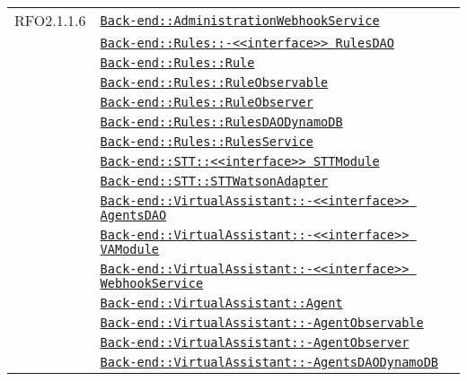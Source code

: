 \begin{longtable}{|>{\centering}m{3cm}|m{10cm}<{\centering}|}
RFO2.1.1.6 & \hyperref[Back-end::AdministrationWebhookService]{\texttt{Back-end::AdministrationWebhookService}}\\
& \hyperref[Back-end::Rules::<<interface>> RulesDAO]{\texttt{Back-end::Rules::-\linebreak <<interface>> RulesDAO}}\\
& \hyperref[Back-end::Rules::Rule]{\texttt{Back-end::Rules::Rule}}\\
& \hyperref[Back-end::Rules::RuleObservable]{\texttt{Back-end::Rules::RuleObservable}}\\
& \hyperref[Back-end::Rules::RuleObserver]{\texttt{Back-end::Rules::RuleObserver}}\\
& \hyperref[Back-end::Rules::RulesDAODynamoDB]{\texttt{Back-end::Rules::RulesDAODynamoDB}}\\
& \hyperref[Back-end::Rules::RulesService]{\texttt{Back-end::Rules::RulesService}}\\
& \hyperref[Back-end::STT::<<interface>> STTModule]{\texttt{Back-end::STT::<<interface>> STTModule}}\\
& \hyperref[Back-end::STT::STTWatsonAdapter]{\texttt{Back-end::STT::STTWatsonAdapter}}\\
& \hyperref[Back-end::VirtualAssistant::<<interface>> AgentsDAO]{\texttt{Back-end::VirtualAssistant::-\linebreak <<interface>> AgentsDAO}}\\
& \hyperref[Back-end::VirtualAssistant::<<interface>> VAModule]{\texttt{Back-end::VirtualAssistant::-\linebreak <<interface>> VAModule}}\\
& \hyperref[Back-end::VirtualAssistant::<<interface>> WebhookService]{\texttt{Back-end::VirtualAssistant::-\linebreak <<interface>> WebhookService}}\\
& \hyperref[Back-end::VirtualAssistant::Agent]{\texttt{Back-end::VirtualAssistant::Agent}}\\
& \hyperref[Back-end::VirtualAssistant::AgentObservable]{\texttt{Back-end::VirtualAssistant::-\linebreak AgentObservable}}\\
& \hyperref[Back-end::VirtualAssistant::AgentObserver]{\texttt{Back-end::VirtualAssistant::-\linebreak AgentObserver}}\\
& \hyperref[Back-end::VirtualAssistant::AgentsDAODynamoDB]{\texttt{Back-end::VirtualAssistant::-\linebreak AgentsDAODynamoDB}}\\

\end{longtable}
